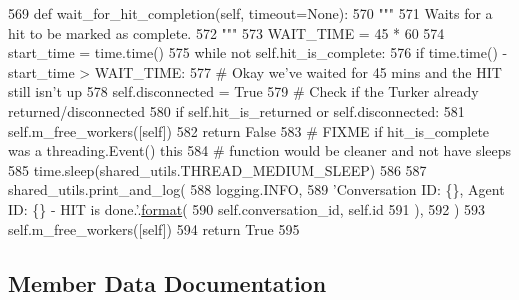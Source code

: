 \begin{DoxyCode}
569     \textcolor{keyword}{def }wait\_for\_hit\_completion(self, timeout=None):
570         \textcolor{stringliteral}{"""}
571 \textcolor{stringliteral}{        Waits for a hit to be marked as complete.}
572 \textcolor{stringliteral}{        """}
573         WAIT\_TIME = 45 * 60
574         start\_time = time.time()
575         \textcolor{keywordflow}{while} \textcolor{keywordflow}{not} self.hit\_is\_complete:
576             \textcolor{keywordflow}{if} time.time() - start\_time > WAIT\_TIME:
577                 \textcolor{comment}{# Okay we've waited for 45 mins and the HIT still isn't up}
578                 self.disconnected = \textcolor{keyword}{True}
579             \textcolor{comment}{# Check if the Turker already returned/disconnected}
580             \textcolor{keywordflow}{if} self.hit\_is\_returned \textcolor{keywordflow}{or} self.disconnected:
581                 self.m\_free\_workers([self])
582                 \textcolor{keywordflow}{return} \textcolor{keyword}{False}
583             \textcolor{comment}{# FIXME if hit\_is\_complete was a threading.Event() this}
584             \textcolor{comment}{# function would be cleaner and not have sleeps}
585             time.sleep(shared\_utils.THREAD\_MEDIUM\_SLEEP)
586 
587         shared\_utils.print\_and\_log(
588             logging.INFO,
589             \textcolor{stringliteral}{'Conversation ID: \{\}, Agent ID: \{\} - HIT is done.'}.\hyperlink{namespaceparlai_1_1chat__service_1_1services_1_1messenger_1_1shared__utils_a32e2e2022b824fbaf80c747160b52a76}{format}(
590                 self.conversation\_id, self.id
591             ),
592         )
593         self.m\_free\_workers([self])
594         \textcolor{keywordflow}{return} \textcolor{keyword}{True}
595 
\end{DoxyCode}


\subsection{Member Data Documentation}
\mbox{\label{classparlai_1_1mturk_1_1core_1_1dev_1_1agents_1_1MTurkAgent_ae49017b77979eb6f71db8e1f24cc5bc9}} 
